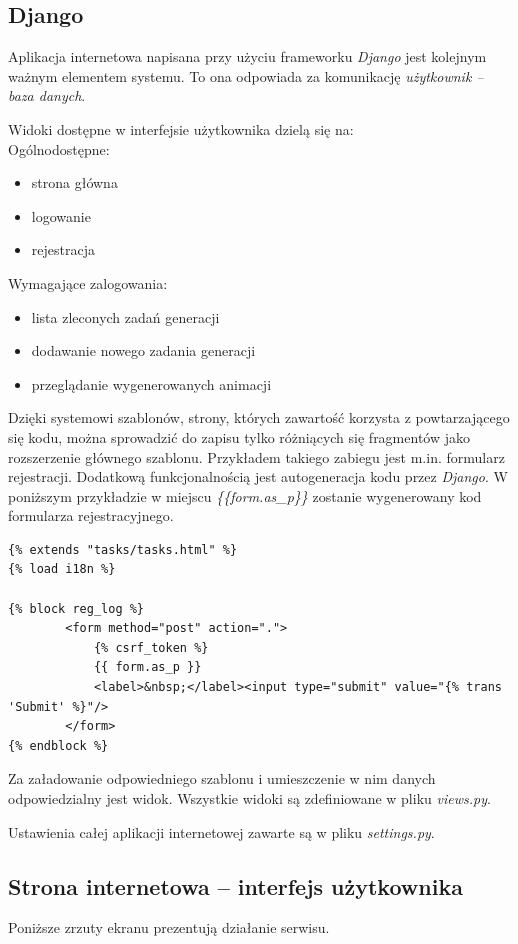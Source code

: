 \documentclass[a4paper]{article}
\begin{document}
\subsection{Django}
Aplikacja internetowa napisana przy użyciu frameworku \textit{Django} jest kolejnym ważnym elementem systemu. To ona odpowiada za komunikację \textit{użytkownik -- baza danych}.

Widoki dostępne w interfejsie użytkownika dzielą się na:\\
Ogólnodostępne:
\begin{itemize}
\item strona główna
\item logowanie
\item rejestracja
\end{itemize}
Wymagające zalogowania:
\begin{itemize}
\item lista zleconych zadań generacji
\item dodawanie nowego zadania generacji
\item przeglądanie wygenerowanych animacji
\end{itemize}

Dzięki systemowi szablonów, strony, których zawartość korzysta z powtarzającego się kodu, można sprowadzić do zapisu tylko różniących się fragmentów jako rozszerzenie głównego szablonu. Przykładem takiego zabiegu jest m.in. formularz rejestracji. Dodatkową funkcjonalnością jest autogeneracja kodu przez \textit{Django}. W poniższym przykładzie w miejscu \textit{\{\{form.as\_p\}\}} zostanie wygenerowany kod formularza rejestracyjnego.

\begin{lstlisting}
{% extends "tasks/tasks.html" %}
{% load i18n %}

{% block reg_log %}
        <form method="post" action=".">
            {% csrf_token %}
            {{ form.as_p }}
            <label>&nbsp;</label><input type="submit" value="{% trans 'Submit' %}"/>
        </form>
{% endblock %}
\end{lstlisting}

Za załadowanie odpowiedniego szablonu i umieszczenie w nim danych odpowiedzialny jest widok. Wszystkie widoki są zdefiniowane w pliku \textit{views.py}.

Ustawienia całej aplikacji internetowej zawarte są w pliku \textit{settings.py}. 

\subsection{Strona internetowa -- interfejs użytkownika}
Poniższe zrzuty ekranu prezentują działanie serwisu.
\end{document}
